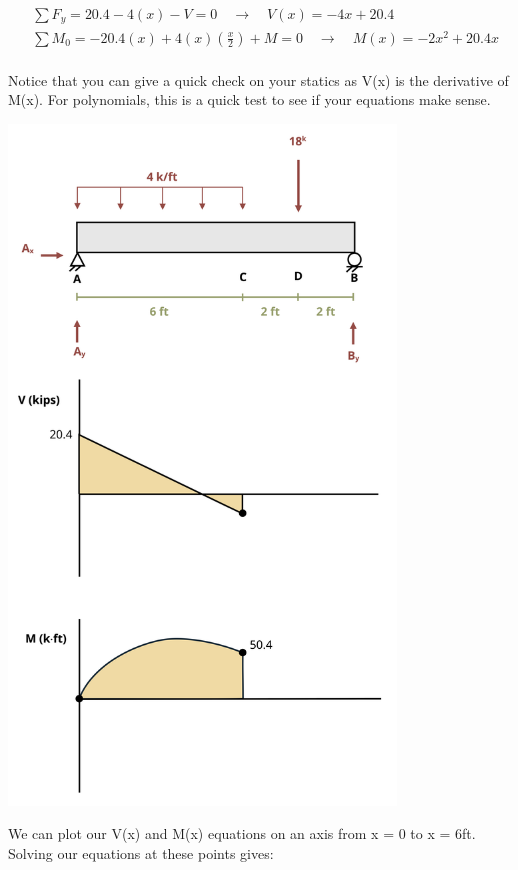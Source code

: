 \documentclass[
  letterpaper,
  DIV=11,
  numbers=noendperiod]{scrreprt}
\begin{document}
\begin{tcolorbox}
\begin{tcolorbox}
\[
\begin{aligned}
&\sum F_y=20.4-4(x) -V=0 \quad\rightarrow\quad V(x)=-4 x+20.4 \\
&\sum M_0=-20.4(x)+4(x)\left(\frac{x}{2}\right)+M=0 \quad\rightarrow\quad M(x)=-2 x^2+20.4 x \\
\end{aligned}
\]

Notice that you can give a quick check on your statics as V(x) is the
derivative of M(x). For polynomials, this is a quick test to see if your
equations make sense.

\begin{center}
\includegraphics[width=4.05208in,height=\textheight]{images/CH7 PNGs/example 7.2 part 5.png}
\end{center}

We can plot our V(x) and M(x) equations on an axis from x = 0 to x =
6ft. Solving our equations at these points gives:


\end{tcolorbox}
\end{tcolorbox}
\end{document}
